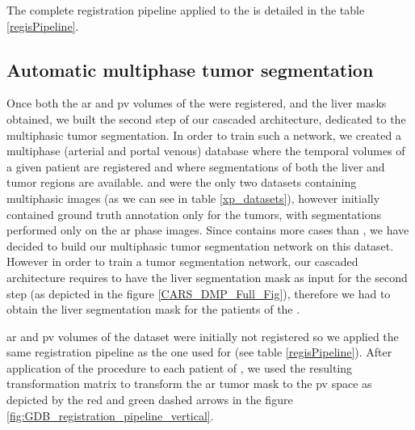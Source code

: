 The complete registration pipeline applied to the \textbf{} is detailed in the table \ref{regisPipeline}.

\subsection{Automatic multiphase tumor segmentation}\label{tcia-db-unsupervised-multiphase-tumor-segmentation}

Once both the \ac{ar} and \ac{pv} volumes of the \textbf{} were registered, and the
liver masks obtained, we built the second step of our cascaded
architecture, dedicated to the multiphasic tumor segmentation. In order
to train such a network, we created a multiphase (arterial and portal
venous) database where the temporal volumes of a given patient are
registered and where segmentations of both the liver and tumor regions
are available.
\textbf{} and \textbf{} were the only two datasets containing multiphasic
images (as we can see in table \ref{xp_datasets}), however
\textbf{} initially contained ground truth annotation only for the tumors,
with segmentations performed only on the \ac{ar} phase images.
Since \textbf{} contains more cases than \textbf{}, we have decided to
build our multiphasic tumor segmentation network on this dataset.
However in order to train a tumor segmentation network, our cascaded
architecture requires to have the liver segmentation mask as input for
the second step (as depicted in the figure \ref{CARS_DMP_Full_Fig}), therefore we had to obtain the liver segmentation
mask for the patients of the \textbf{}.

\ac{ar} and \ac{pv} volumes of the \textbf{} dataset were initially not registered so
we applied the same registration pipeline as the one used for \textbf{} (see table \ref{regisPipeline}). After application of the procedure to
each patient of \textbf{}, we used the resulting transformation matrix to
transform the \ac{ar} tumor mask to the \ac{pv} space as depicted by the red and green dashed arrows in the figure \ref{fig:GDB_registration_pipeline_vertical}.


